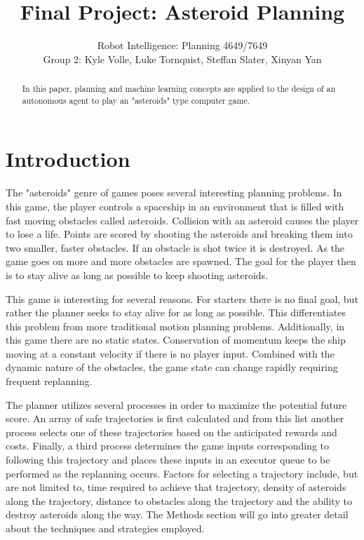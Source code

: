 \documentclass[10pt,final,conference]{IEEEtran}
\begin{document}
\title{Final Project: Asteroid Planning}
\author{Robot Intelligence: Planning 4649/7649 \\
Group 2: Kyle Volle, Luke Tornquist, Steffan Slater, Xinyan Yan}
\maketitle


\newpage

\nocite{*}

\begin{abstract}
In this paper, planning and machine learning concepts are applied to the design of an autonomous agent to play an "asteroids" type computer game. 
\end{abstract}

\section{Introduction}

The "asteroids" genre of games poses several interesting planning problems. In this game, the player controls a spaceship in an environment that is filled with fast moving obstacles called asteroids. Collision with an asteroid causes the player to lose a life. Points are scored by shooting the asteroids and breaking them into two smaller, faster obstacles. If an obstacle is shot twice it is destroyed. As the game goes on more and more obstacles are spawned. The goal for the player then is to stay alive as long as possible to keep shooting asteroids.

This game is interesting for several reasons. For starters there is no final goal, but rather the planner seeks to stay alive for as long as possible. This differentiates this problem from more traditional motion planning problems. Additionally, in this game there are no static states. Conservation of momentum keeps the ship moving at a constant velocity if there is no player input. Combined with the dynamic nature of the obstacles, the game state can change rapidly requiring frequent replanning.

The planner utilizes several processes in order to maximize the potential future score. An array of safe trajectories is first calculated and from this list another process selects one of these trajectories based on the anticipated rewards and costs. Finally, a third process determines the game inputs corresponding to following this trajectory and places these inputs in an executor queue to be performed as the replanning occurs. Factors for selecting a trajectory include, but are not limited to, time required to achieve that trajectory, density of asteroids along the trajectory, distance to obstacles along the trajectory and the ability to destroy asteroids along the way. The Methods section will go into greater detail about the techniques and strategies employed.
\end{document}
